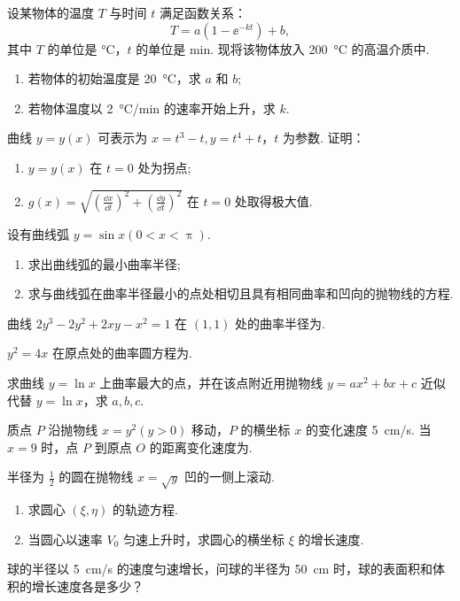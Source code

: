 	\begin{ti}
		设某物体的温度 $T$ 与时间 $t$ 满足函数关系：
		\[
			T = a\left( 1 - \ee^{-kt} \right) + b,
		\]
		其中 $T$ 的单位是 \si{\degreeCelsius}，$t$ 的单位是 \si{min}. 现将该物体放入 \SI{200}{\degreeCelsius} 的高温介质中.
		\begin{enumerate}
			\item 若物体的初始温度是 \SI{20}{\degreeCelsius}，求 $a$ 和 $b$;
			\item 若物体温度以 \SI{2}{\degreeCelsius/min} 的速率开始上升，求 $k$.
		\end{enumerate}
	\end{ti}

	\begin{ti}
		曲线 $y = y(x)$ 可表示为 $x = t^{3} - t, y = t^{4} + t$，$t$ 为参数. 证明：
		\begin{enumerate}
			\item $y = y(x)$ 在 $t = 0$ 处为拐点;
			\item $g(x) = \sqrt{\left( \frac{\dd{x}}{\dd{t}} \right)^{2} + \left( \frac{\dd{y}}{\dd{t}} \right)^{2}}$ 在 $t = 0$ 处取得极大值.
		\end{enumerate}
	\end{ti}

	\begin{ti}
		设有曲线弧 $y = \sin x(0 < x < \uppi)$.
		\begin{enumerate}
			\item 求出曲线弧的最小曲率半径;
			\item 求与曲线弧在曲率半径最小的点处相切且具有相同曲率和凹向的抛物线的方程.
		\end{enumerate}
	\end{ti}

	\begin{ti}
		曲线 $2y^{3} - 2y^{2} + 2xy - x^{2} = 1$ 在 $(1,1)$ 处的曲率半径为\htwo.
	\end{ti}

	\begin{ti}
		$y^{2} = 4x$ 在原点处的曲率圆方程为\htwo.
	\end{ti}

	\begin{ti}
		求曲线 $y = \ln x$ 上曲率最大的点，并在该点附近用抛物线 $y = ax^{2} + bx + c$ 近似代替 $y = \ln x$，求 $a,b,c$.
	\end{ti}

	\begin{ti}
		质点 $P$ 沿抛物线 $x = y^{2}(y > 0)$ 移动，$P$ 的横坐标 $x$ 的变化速度 \SI{5}{cm/s}. 当 $x = 9$ 时，点 $P$ 到原点 $O$ 的距离变化速度为\htwo.
	\end{ti}

	\begin{ti}
		半径为 $\frac{1}{2}$ 的圆在抛物线 $x = \sqrt{y}$ 凹的一侧上滚动.
		\begin{enumerate}
			\item 求圆心 $(\xi,\eta)$ 的轨迹方程.
			\item 当圆心以速率 $V_{0}$ 匀速上升时，求圆心的横坐标 $\xi$ 的增长速度.
		\end{enumerate}
	\end{ti}

	\begin{ti}
		球的半径以 \SI{5}{cm/s} 的速度匀速增长，问球的半径为 \SI{50}{cm} 时，球的表面积和体积的增长速度各是多少？
	\end{ti}